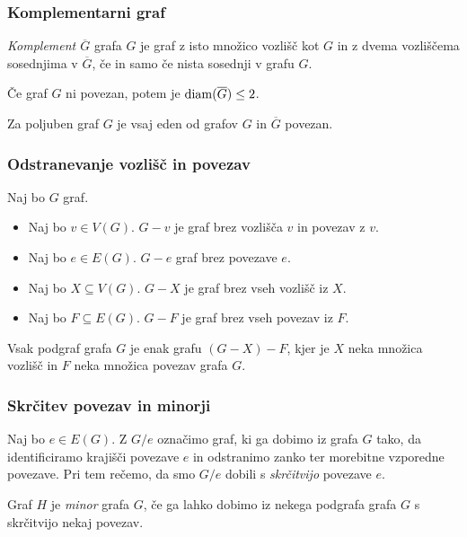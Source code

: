 \subsubsection*{Komplementarni graf}
\begin{definicija}
    \emph{Komplement $\overline{G}$} grafa $G$ je graf z isto množico vozlišč kot $G$ in z dvema vozliščema sosednjima v $\overline{G}$, če in samo če nista sosednji v grafu $G$.
\end{definicija}

\begin{trditev}
    Če graf $G$ ni povezan, potem je $\operatorname{diam}(\overline{G}) \leq 2$.
\end{trditev}

\begin{posledica}
    Za poljuben graf $G$ je vsaj eden od grafov $G$ in $\overline{G}$ povezan.
\end{posledica}

\subsubsection*{Odstranevanje vozlišč in povezav}
Naj bo $G$ graf.
\begin{itemize}
    \item Naj bo $v \in V(G)$. $G - v$ je graf brez vozlišča $v$ in povezav z $v$.
    \item Naj bo $e \in E(G)$. $G - e$ graf brez povezave $e$.
    \item Naj bo $X \subseteq V(G)$. $G - X$ je graf brez vseh vozlišč iz $X$.
    \item Naj bo $F \subseteq E(G)$. $G-F$ je graf brez vseh povezav iz $F$.
\end{itemize}

\begin{opomba}
    Vsak podgraf grafa $G$ je enak grafu $(G-X)-F$, kjer je $X$ neka množica vozlišč in $F$ neka množica povezav grafa $G$.
\end{opomba}

\subsubsection*{Skrčitev povezav in minorji}
Naj bo $e \in E(G)$. Z $G/e$ označimo graf, ki ga dobimo iz grafa $G$ tako, da identificiramo krajišči povezave $e$ in odstranimo zanko ter morebitne vzporedne povezave. Pri tem rečemo, da smo $G / e$ dobili s \emph{skrčitvijo} povezave $e$.

\begin{definicija}
    Graf $H$ je \emph{minor} grafa $G$, če ga lahko dobimo iz nekega podgrafa grafa $G$ s skrčitvijo nekaj povezav.
\end{definicija}

